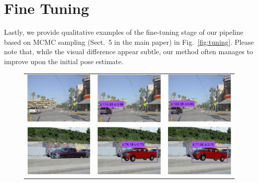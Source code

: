 \documentclass[10pt,twocolumn,letterpaper]{article}
\begin{document}
\section{Fine Tuning}
Lastly, we provide qualitative examples of the fine-tuning stage of
our pipeline based on MCMC sampling (Sect.~5 in the main paper) in
Fig.~\ref{fig:tuning}. Please note that, while the visual difference
appear subtle, our method often manages to improve upon the initial
pose estimate.
%
\begin{figure}[h]
\setlength\tabcolsep{1pt}
\centering
\begin{tabular}{ccc}
  \includegraphics[width=0.22\linewidth]{supp/tuning_1a.png} &
  \includegraphics[width=0.22\linewidth]{supp/tuning_1b.png} & 
  \includegraphics[width=0.22\linewidth]{supp/tuning_1c.png}  \\
  \includegraphics[width=0.22\linewidth]{supp/tuning_2a.png} &
  \includegraphics[width=0.22\linewidth]{supp/tuning_2b.png} & 
  \includegraphics[width=0.22\linewidth]{supp/tuning_2c.png}  \\ 

\end{tabular}
\end{figure}
\end{document}
